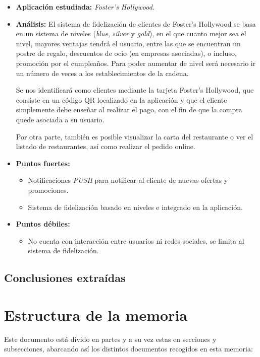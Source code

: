 \documentclass[twoside]{report}
\begin{document}
\begin{itemize}
\item \textbf{Aplicación estudiada:} \cite{fostersh} \textit{Foster's Hollywood.}
\item \textbf{Análisis:} 
El sistema de fidelización de clientes de Foster's Hollywood se basa en un sistema de niveles (\textit{blue}, \textit{silver} y \textit{gold}), en el que cuanto mejor sea el nivel, mayores ventajas tendrá el usuario, entre las que se encuentran un postre de regalo, descuentos de ocio (en empresas asociadas), o incluso, promoción por el cumpleaños. Para poder aumentar de nivel será necesario ir un número de veces a los establecimientos de la cadena. 

Se nos identificará como clientes mediante la tarjeta Foster's Hollywood, que consiste en un código QR localizado en la aplicación y que el cliente simplemente debe enseñar al realizar el pago, con el fin de que la compra quede asociada a su usuario.

Por otra parte, también es posible visualizar la carta del restaurante o ver el listado de restaurantes, así como realizar el pedido online.
\item \textbf{Puntos fuertes:}
	\begin{itemize}
	\item Notificaciones \textit{PUSH} para notificar al cliente de nuevas ofertas y promociones.
	\item Sistema de fidelización basado en niveles e integrado en la aplicación.
	\end{itemize}
\item \textbf{Puntos débiles:}
	\begin{itemize}
	\item No cuenta con interacción entre usuarios ni redes sociales, se limita al sistema de fidelización.
	\end{itemize}
\end{itemize}

\subsection{Conclusiones extraídas}

\section{Estructura de la memoria}

Este documento está divido en partes y a su vez estas en secciones y subsecciones, abarcando así los distintos documentos recogidos en esta memoria:
\end{document}
